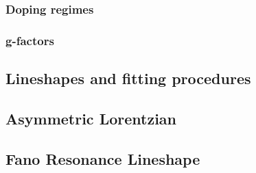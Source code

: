 \documentclass{scrbook}
\begin{document}
		\subsection{Doping regimes}
		\subsection{g-factors}

\begin{appendices}
\chapter{Lineshapes and fitting procedures}
	\section{Asymmetric Lorentzian}
	\section{Fano Resonance Lineshape}
\end{appendices}
\end{document}
